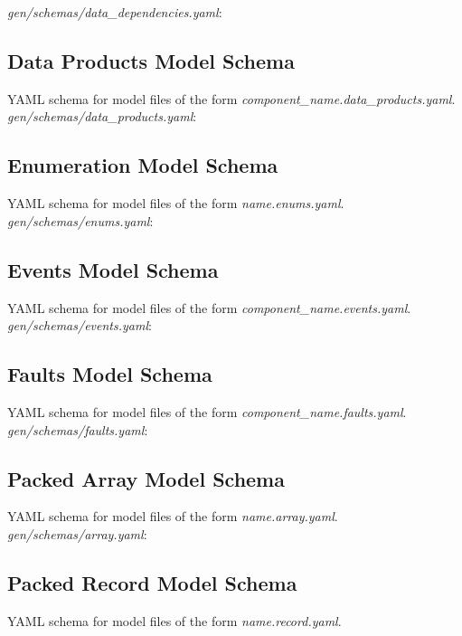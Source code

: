 \begin{appendices}
\textit{gen/schemas/data\_dependencies.yaml}:

\subsection{Data Products Model Schema}
YAML schema for model files of the form \textit{component\_name.data\_products.yaml}. \\

\textit{gen/schemas/data\_products.yaml}:

\subsection{Enumeration Model Schema}
YAML schema for model files of the form \textit{name.enums.yaml}. \\

\textit{gen/schemas/enums.yaml}:

\subsection{Events Model Schema}
YAML schema for model files of the form \textit{component\_name.events.yaml}. \\

\textit{gen/schemas/events.yaml}:

\subsection{Faults Model Schema}
YAML schema for model files of the form \textit{component\_name.faults.yaml}. \\

\textit{gen/schemas/faults.yaml}: \\


\subsection{Packed Array Model Schema}
YAML schema for model files of the form \textit{name.array.yaml}. \\

\textit{gen/schemas/array.yaml}:

\subsection{Packed Record Model Schema}
YAML schema for model files of the form \textit{name.record.yaml}. \\


\end{appendices}
